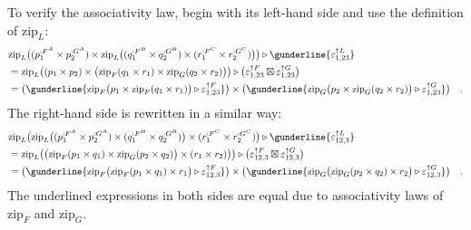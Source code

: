 To verify the associativity law, begin with its left-hand side and
use the definition of $\text{zip}_{L}$:
\begin{align*}
 & \text{zip}_{L}\big((p_{1}^{:F^{A}}\times p_{2}^{:G^{A}})\times\text{zip}_{L}\big((q_{1}^{:F^{B}}\times q_{2}^{:G^{B}})\times(r_{1}^{:F^{C}}\times r_{2}^{:G^{C}})\big)\big)\triangleright\gunderline{\varepsilon_{1,23}^{\uparrow L}}\\
 & =\text{zip}_{L}\big((p_{1}\times p_{2})\times\big(\text{zip}_{F}(q_{1}\times r_{1})\times\text{zip}_{G}(q_{2}\times r_{2})\big)\big)\triangleright\big(\varepsilon_{1,23}^{\uparrow F}\boxtimes\varepsilon_{1,23}^{\uparrow G}\big)\\
 & =\big(\gunderline{\text{zip}_{F}\big(p_{1}\times\text{zip}_{F}(q_{1}\times r_{1})\big)\triangleright\varepsilon_{1,23}^{\uparrow F}}\big)\times\big(\gunderline{\text{zip}_{G}\big(p_{2}\times\text{zip}_{G}(q_{2}\times r_{2})\big)\triangleright\varepsilon_{1,23}^{\uparrow G}}\big)\quad.
\end{align*}
The right-hand side is rewritten in a similar way:
\begin{align*}
 & \text{zip}_{L}\big(\text{zip}_{L}\big((p_{1}^{:F^{A}}\times p_{2}^{:G^{A}})\times(q_{1}^{:F^{B}}\times q_{2}^{:G^{B}})\big)\times(r_{1}^{:F^{C}}\times r_{2}^{:G^{C}})\big)\triangleright\gunderline{\varepsilon_{12,3}^{\uparrow L}}\\
 & =\text{zip}_{L}\big(\big(\text{zip}_{F}(p_{1}\times q_{1})\times\text{zip}_{G}(p_{2}\times q_{2})\big)\times(r_{1}\times r_{2})\big)\big)\triangleright\big(\varepsilon_{12,3}^{\uparrow F}\boxtimes\varepsilon_{12,3}^{\uparrow G}\big)\\
 & =\big(\gunderline{\text{zip}_{F}\big(\text{zip}_{F}(p_{1}\times q_{1})\times r_{1}\big)\triangleright\varepsilon_{12,3}^{\uparrow F}}\big)\times\big(\gunderline{\text{zip}_{G}\big(\text{zip}_{G}(p_{2}\times q_{2})\times r_{2}\big)\triangleright\varepsilon_{12,3}^{\uparrow G}}\big)\quad.
\end{align*}
The underlined expressions in both sides are equal due to associativity
laws of $\text{zip}_{F}$ and $\text{zip}_{G}$.


